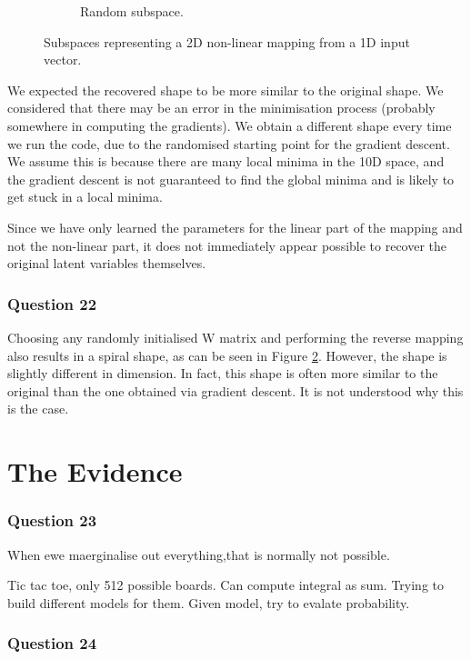 \documentclass[10pt, a4paper, twocolumn]{article} %
\begin{document}
\begin{figure}[!htb]
\begin{subfigure}{.5\linewidth}
  \caption{Random subspace.}
  \label{fig:q22}
\end{subfigure}
\caption{Subspaces representing a 2D non-linear mapping from a 1D input vector. }
\end{figure}

We expected the recovered shape to be more similar to the original shape. We considered that there may be an error in the minimisation process (probably somewhere in computing the gradients). We obtain a different shape every time we run the code, due to the randomised starting point for the gradient descent. We assume this is because there are many local minima in the 10D space, and the gradient descent is not guaranteed to find the global minima and is likely to get stuck in a local minima.

Since we have only learned the parameters for the linear part of the mapping and not the non-linear part, it does not immediately appear possible to recover the original latent variables themselves.

\subsubsection*{Question 22}

Choosing any randomly initialised W matrix and performing the reverse mapping also results in a spiral shape, as can be seen in Figure \ref{fig:q22}. However, the shape is slightly different in dimension. In fact, this shape is often more similar to the original than the one obtained via gradient descent. It is not understood why this is the case.

\section{The Evidence}

\subsubsection*{Question 23}

When ewe maerginalise out everything,that is normally not possible.

Tic tac toe, only 512 possible boards. Can compute integral as sum. Trying to build different models for them. Given model, try to evalate probability.

\subsubsection*{Question 24}
\end{document}
